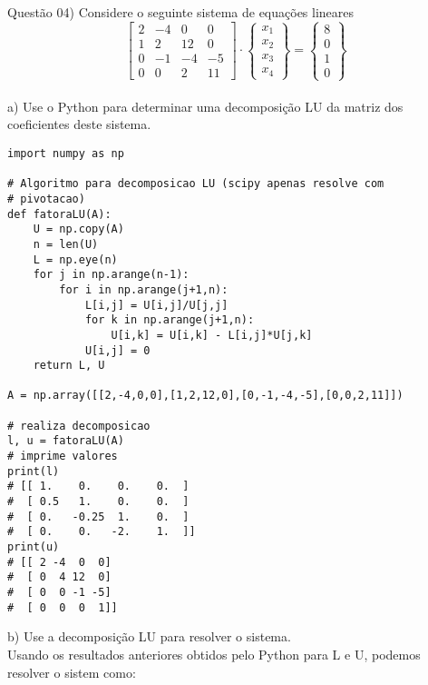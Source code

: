 
\noindent \textcolor{COLOR1}{Questão 04)} Considere o seguinte sistema de equações lineares
\\

\[
    \begin{bmatrix}
        2 & -4 & 0  & 0  \\
        1 & 2  & 12 & 0  \\
        0 & -1 & -4 & -5 \\
        0 & 0  & 2  & 11
    \end{bmatrix}
    \cdot
    \begin{Bmatrix}
        x_1 \\
        x_2 \\
        x_3 \\
        x_4
    \end{Bmatrix}
    =
    \begin{Bmatrix}
        8 \\
        0 \\
        1 \\
        0
    \end{Bmatrix}
\]
\\

a) Use o Python para determinar uma decomposição LU da matriz dos coeficientes deste
sistema.
\\

\begin{lstlisting}
import numpy as np

# Algoritmo para decomposicao LU (scipy apenas resolve com
# pivotacao)
def fatoraLU(A):  
    U = np.copy(A)  
    n = len(U)
    L = np.eye(n)  
    for j in np.arange(n-1):  
        for i in np.arange(j+1,n):  
            L[i,j] = U[i,j]/U[j,j]  
            for k in np.arange(j+1,n):  
                U[i,k] = U[i,k] - L[i,j]*U[j,k]  
            U[i,j] = 0  
    return L, U
    
A = np.array([[2,-4,0,0],[1,2,12,0],[0,-1,-4,-5],[0,0,2,11]])
    
# realiza decomposicao
l, u = fatoraLU(A)
# imprime valores
print(l)
# [[ 1.    0.    0.    0.  ]
#  [ 0.5   1.    0.    0.  ]
#  [ 0.   -0.25  1.    0.  ]
#  [ 0.    0.   -2.    1.  ]]
print(u)
# [[ 2 -4  0  0]
#  [ 0  4 12  0]
#  [ 0  0 -1 -5]
#  [ 0  0  0  1]]
\end{lstlisting}


b) Use a decomposição LU para resolver o sistema.
\\

Usando os resultados anteriores obtidos pelo Python para L e U, podemos resolver o sistem como:
\\

